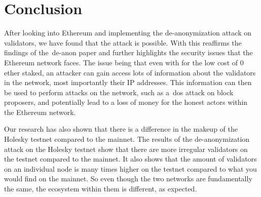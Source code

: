 

\section{Conclusion}\label{sec:conclusion}
After looking into Ethereum and implementing the de-anonymization attack on validators, we have found that the attack is possible.
With this reaffirms the findings of the~\gls{de-anon paper} and further highlights the security issues that the Ethereum network faces.
The issue being that even with for the low cost of 0 ether staked, an attacker can gain access lots of information about the validators in the network, most importantly their IP addresses.
This information can then be used to perform attacks on the network, such as a~\gls{dos} attack on block proposers, and potentially lead to a loss of money for the honest actors within the Ethereum network.


Our research has also shown that there is a difference in the makeup of the Holesky testnet compared to the mainnet.
The results of the de-anonymization attack on the Holesky testnet show that there are more irregular validators on the testnet compared to the mainnet.
It also shows that the amount of validators on an individual node is many times higher on the testnet compared to what you would find on the mainnet.
So even though the two networks are fundamentally the same, the ecosystem within them is different, as expected.